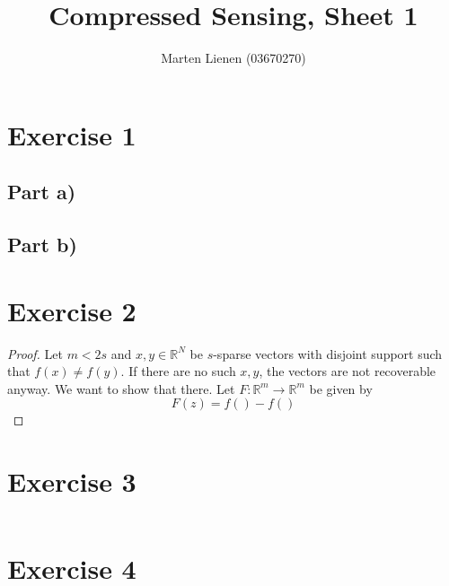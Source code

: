 \documentclass[10pt,a4paper]{article}
\title{Compressed Sensing, Sheet 1}
\author{Marten Lienen (03670270)}
\begin{document}
\maketitle

\section*{Exercise 1}

\subsection*{Part a)}

\subsection*{Part b)}

\section*{Exercise 2}

\begin{proof}
  Let $m < 2s$ and $x, y \in \mathbb{R}^{N}$ be $s$-sparse vectors with disjoint support such that $f(x) \ne f(y)$.
  If there are no such $x, y$, the vectors are not recoverable anyway.
  We want to show that there.
  Let $F : \mathbb{R}^{m} \rightarrow \mathbb{R}^{m}$ be given by
  \begin{equation*}
    F(z) = f() - f()
  \end{equation*}
\end{proof}

\section*{Exercise 3}

\inputminted{matlab}{sheet-1/prony.m}

\section*{Exercise 4}
\end{document}
